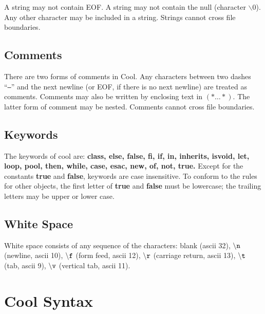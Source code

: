 \documentclass[11pt]{article}
\begin{document}

A string may not contain EOF.  
A string may not contain the null (character {\tt $\backslash 0$}).
Any other character may be included
in a string.
Strings cannot cross file boundaries.

\subsection{Comments}

There are two forms of comments in Cool.  Any characters between two
dashes ``{\tt --}'' and the next newline (or EOF, if there is no next
newline) are treated as comments.  Comments may also be written by
enclosing text in $(\ast \ldots \ast )$.  The latter form of comment
may be nested.  Comments cannot cross file boundaries.

\subsection{Keywords}

The keywords of cool are:
{\bf class, else, false, fi, if, in, inherits, isvoid, let, loop, 
pool, then, while, case, esac, new, of, not, true.}  Except for the constants
{\bf true} and {\bf false}, keywords are case insensitive.  To conform to
the rules for other objects, the first letter of {\bf true} and {\bf false}
must be lowercase; the trailing letters may be upper or lower case.

\subsection{White Space}

White space consists of any sequence of the characters: 
blank (ascii 32),
$\tt \backslash n$ (newline, ascii 10), 
$\tt \backslash f$ (form feed, ascii 12),
$\tt \backslash r$ (carriage return, ascii 13),
$\tt \backslash t$ (tab, ascii 9), 
$\tt \backslash v$ (vertical tab, ascii 11).
\section{Cool Syntax}
\label{sec-gram}
\end{document}
